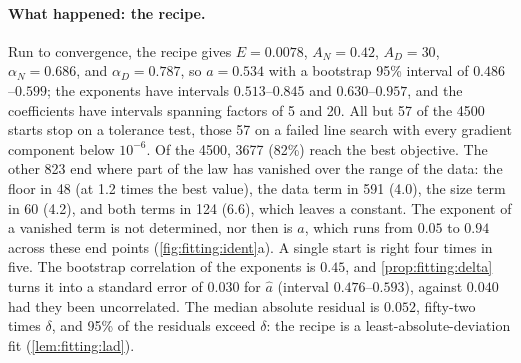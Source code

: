 \begin{refsection}
\paragraph{What happened: the recipe.} Run to convergence, the recipe gives $E=0.0078$, $A_N=0.42$, $A_D=30$, $\alpha_N=0.686$, and $\alpha_D=0.787$, so $a=0.534$ with a bootstrap 95\% interval of $0.486$--$0.599$; the exponents have intervals $0.513$--$0.845$ and $0.630$--$0.957$, and the coefficients have intervals spanning factors of 5 and 20. All but 57 of the 4500 starts stop on a tolerance test, those 57 on a failed line search with every gradient component below $10^{-6}$. Of the 4500, 3677 (82\%) reach the best objective. The other 823 end where part of the law has vanished over the range of the data: the floor in 48 (at 1.2 times the best value), the data term in 591 (4.0), the size term in 60 (4.2), and both terms in 124 (6.6), which leaves a constant. The exponent of a vanished term is not determined, nor then is $a$, which runs from $0.05$ to $0.94$ across these end points (\cref{fig:fitting:ident}a). A single start is right four times in five. The bootstrap correlation of the exponents is $0.45$, and \cref{prop:fitting:delta} turns it into a standard error of $0.030$ for $\hat a$ (interval $0.476$--$0.593$), against $0.040$ had they been uncorrelated. The median absolute residual is $0.052$, fifty-two times $\delta$, and 95\% of the residuals exceed $\delta$: the recipe is a least-absolute-deviation fit (\cref{lem:fitting:lad}).


\end{refsection}

